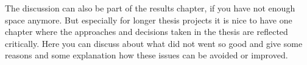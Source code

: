 The discussion can also be part of the results chapter, if you have not enough space anymore. But especially for longer thesis projects it is nice to have one chapter where the approaches and decisions taken in the thesis are reflected critically. 
Here you can discuss about what did not went so good and give some reasons and some explanation how these issues can be avoided or improved. 


